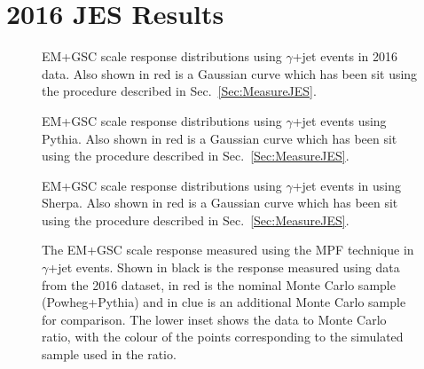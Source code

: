 \chapter{2016 JES Results}
\label{App:2016}

\begin{figure}[!ht]
  \begin{center}
  \end{center}
  \caption[EM scale response distributions in data using $\gamma$+jet in 2016]
  {\small EM+GSC scale response distributions using $\gamma$+jet events in 2016 data.  Also shown in red is a Gaussian curve which has been sit using the procedure described in Sec.~\ref{Sec:MeasureJES}. }
  \label{plot:GJetEM2016DataDistsApp}
\end{figure}

\begin{figure}[!ht]
  \begin{center}
  \end{center}
  \caption[EM scale response distributions in Pythia using $\gamma$+jet in 2016]
  {\small EM+GSC scale response distributions using $\gamma$+jet events using Pythia.  Also shown in red is a Gaussian curve which has been sit using the procedure described in Sec.~\ref{Sec:MeasureJES}. }
  \label{plot:GJetEM2016PythiaistsApp}
\end{figure}

\begin{figure}[!ht]
  \begin{center}
  \end{center}
  \caption[EM scale response distributions in Sherpa using $\gamma$+jet in 2016]
  {\small EM+GSC scale response distributions using $\gamma$+jet events in using Sherpa.  Also shown in red is a Gaussian curve which has been sit using the procedure described in Sec.~\ref{Sec:MeasureJES}. }
  \label{plot:GJetEM2016SherpaDistsApp}
\end{figure}

\begin{figure}[!ht]
  \begin{center}
  \end{center}
  \caption[EM scale response using $\gamma$+jet in 2016]
  {\small The EM+GSC scale response measured using the MPF technique in $\gamma$+jet events.  Shown in black is the response measured using data from the 2016 dataset, in red is the nominal Monte Carlo sample (Powheg+Pythia) and in clue is an additional Monte Carlo sample for comparison.  The lower inset shows the data to Monte Carlo ratio, with the colour of the points corresponding to the simulated sample used in the ratio.  }
  \label{plot:GJetEM2016App}
\end{figure}

